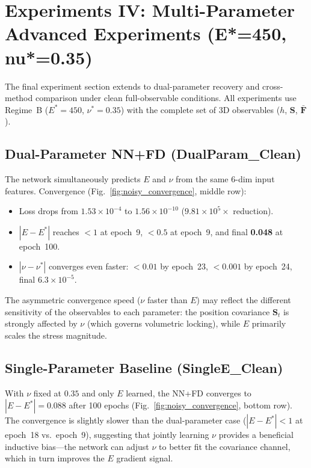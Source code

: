 \documentclass{article}
\begin{document}
\section{Experiments IV: Multi-Parameter Advanced Experiments (E*=450, nu*=0.35)}
\label{sec:multiparam}

The final experiment section extends to dual-parameter recovery and
cross-method comparison under clean full-observable conditions.  All
experiments use Regime~B ($E^*=450$, $\nu^*=0.35$) with the complete set
of 3D observables ($h$, $\mathbf{S}$, $\bar{\mathbf{F}}$).

\subsection{Dual-Parameter NN+FD (DualParam\_Clean)}

The network simultaneously predicts $E$ and $\nu$ from the same 6-dim
input features.  Convergence (Fig.~\ref{fig:noisy_convergence}, middle row):
\begin{itemize}[itemsep=1pt]
\item Loss drops from $1.53\times10^{-4}$ to $1.56\times10^{-10}$
  ($9.81\times10^{5}\times$ reduction).
\item $|E-E^*|$ reaches $<1$ at epoch~9, $<0.5$ at epoch~9, and final
  \textbf{0.048} at epoch~100.
\item $|\nu-\nu^*|$ converges even faster: $<0.01$ by epoch~23, $<0.001$
  by epoch~24, final \textbf{$6.3\times10^{-5}$}.
\end{itemize}

The asymmetric convergence speed ($\nu$ faster than $E$) may reflect the
different sensitivity of the observables to each parameter: the position
covariance $\mathbf{S}_t$ is strongly affected by $\nu$ (which governs
volumetric locking), while $E$ primarily scales the stress magnitude.

\subsection{Single-Parameter Baseline (SingleE\_Clean)}

With $\nu$ fixed at $0.35$ and only $E$ learned, the NN+FD converges to
$|E-E^*|=0.088$ after 100 epochs (Fig.~\ref{fig:noisy_convergence},
bottom row).  The convergence is slightly slower than the dual-parameter
case ($|E-E^*|<1$ at epoch~18 vs.\ epoch~9), suggesting that jointly
learning $\nu$ provides a beneficial inductive bias---the network can
adjust $\nu$ to better fit the covariance channel, which in turn
improves the $E$ gradient signal.
\end{document}
